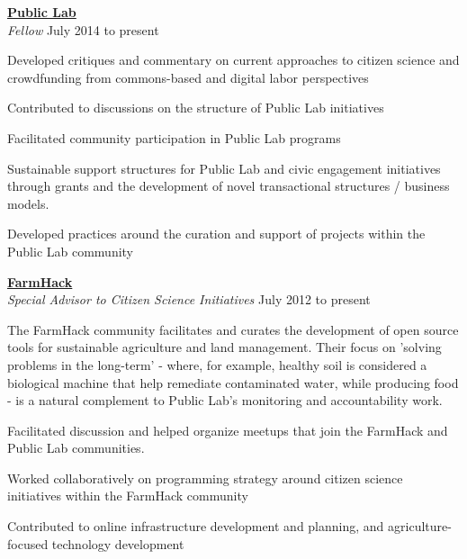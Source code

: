 \documentclass[10pt]{article}
\newcommand{\blankline}{\quad\pagebreak[3]}
\newcommand{\halfblankline}{\quad\vspace{-0.5\baselineskip}\pagebreak[3]}
\begin{document}
\blankline


\href{http://publiclab.org}{\textbf{Public Lab}} \\
\emph{Fellow}  \hfill {July 2014 to present}

\halfblankline

\begin{innerlist}
\item Developed critiques and commentary on current approaches to citizen science and crowdfunding from commons-based and digital labor perspectives
\item Contributed to discussions on the structure of Public Lab initiatives
\item Facilitated community participation in Public Lab programs
\item Sustainable support structures for Public Lab and civic engagement initiatives through grants and the development of novel transactional structures / business models.
\item Developed practices around the curation and support of projects within the Public Lab community

\end{innerlist}
   
\blankline
\blankline

\begin{minipage}{\textwidth}
\href{http://FarmHack.net}{\textbf{FarmHack}}  \\
\emph{Special Advisor to Citizen Science Initiatives} \hfill {July 2012 to present}

\halfblankline

The FarmHack community facilitates and curates the development of open source tools for sustainable agriculture and land management.  Their focus on 'solving problems in the long-term' - where, for example, healthy soil is considered a biological machine that help remediate contaminated water, while producing food - is a natural complement to Public Lab's monitoring and accountability work.
\begin{innerlist}
\item Facilitated discussion and helped organize meetups that join the FarmHack and Public Lab communities. 
\item Worked collaboratively on programming strategy around citizen science initiatives within the FarmHack community
\item Contributed to online infrastructure development and planning, and agriculture-focused technology development
\end{innerlist}
   


\blankline

\end{minipage}
\end{document}
